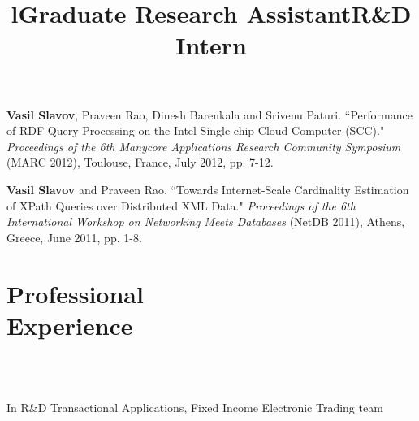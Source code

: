 \documentclass[margin,line]{resume}
\begin{document}
\begin{resume}
\vspace{-2mm}
    \textbf{Vasil Slavov}, Praveen Rao, Dinesh Barenkala and Srivenu Paturi.
    ``Performance of RDF Query Processing on the Intel Single-chip Cloud Computer (SCC)."
    \textsl{Proceedings of the 6th Manycore Applications Research Community Symposium} (MARC 2012), Toulouse, France, July 2012, pp. 7-12.
    
\vspace{-2mm}
    \textbf{Vasil Slavov} and Praveen Rao.
    ``Towards Internet-Scale Cardinality Estimation of XPath Queries over Distributed XML Data."
    \textsl{Proceedings of the 6th International Workshop on Networking Meets Databases} (NetDB 2011), Athens, Greece, June 2011, pp. 1-8.

        
    \section{\mysidestyle Professional\\Experience}
    
    \begin{format}
    \title{l}\\
    \\
    \end{format}

    \title{\textbf{Graduate Research Assistant}}
    \begin{position}\end{position}
    
    \title{\textbf{R\&D Intern}}
    \begin{position}

    In R\&D Transactional Applications, Fixed Income Electronic Trading team
    \end{position}
    

\end{resume}
\end{document}
